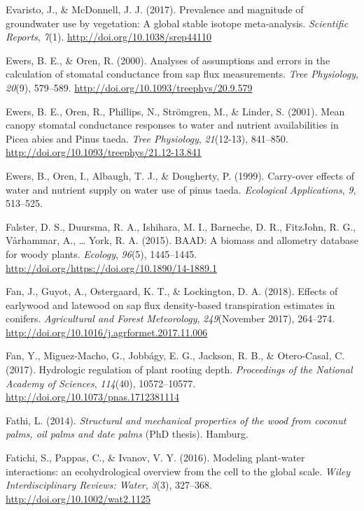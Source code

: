 \documentclass[11pt,twoside]{reedthesis}
\begin{document}
\hypertarget{ref-evaristo2017}{}
Evaristo, J., \& McDonnell, J. J. (2017). Prevalence and magnitude of
groundwater use by vegetation: A global stable isotope meta-analysis.
\emph{Scientific Reports}, \emph{7}(1).
\url{http://doi.org/10.1038/srep44110}

\hypertarget{ref-ewers_analyses_2000}{}
Ewers, B. E., \& Oren, R. (2000). Analyses of assumptions and errors in
the calculation of stomatal conductance from sap flux measurements.
\emph{Tree Physiology}, \emph{20}(9), 579--589.
\url{http://doi.org/10.1093/treephys/20.9.579}

\hypertarget{ref-Ewers2001}{}
Ewers, B. E., Oren, R., Phillips, N., Strömgren, M., \& Linder, S.
(2001). Mean canopy stomatal conductance responses to water and nutrient
availabilities in Picea abies and Pinus taeda. \emph{Tree Physiology},
\emph{21}(12-13), 841--850.
\url{http://doi.org/10.1093/treephys/21.12-13.841}

\hypertarget{ref-Ewers1999}{}
Ewers, B., Oren, I., Albaugh, T. J., \& Dougherty, P. (1999). Carry-over
effects of water and nutrient supply on water use of pinus taeda.
\emph{Ecological Applications}, \emph{9}, 513--525.

\hypertarget{ref-Falster2015}{}
Falster, D. S., Duursma, R. A., Ishihara, M. I., Barneche, D. R.,
FitzJohn, R. G., Vårhammar, A., \ldots{} York, R. A. (2015). BAAD: A
biomass and allometry database for woody plants. \emph{Ecology},
\emph{96}(5), 1445--1445.
\url{http://doi.org/https://doi.org/10.1890/14-1889.1}

\hypertarget{ref-Fan2018}{}
Fan, J., Guyot, A., Ostergaard, K. T., \& Lockington, D. A. (2018).
Effects of earlywood and latewood on sap flux density-based
transpiration estimates in conifers. \emph{Agricultural and Forest
Meteorology}, \emph{249}(November 2017), 264--274.
\url{http://doi.org/10.1016/j.agrformet.2017.11.006}

\hypertarget{ref-fan_hydrologic_2017}{}
Fan, Y., Miguez-Macho, G., Jobbágy, E. G., Jackson, R. B., \&
Otero-Casal, C. (2017). Hydrologic regulation of plant rooting depth.
\emph{Proceedings of the National Academy of Sciences}, \emph{114}(40),
10572--10577. \url{http://doi.org/10.1073/pnas.1712381114}

\hypertarget{ref-Fathi2014}{}
Fathi, L. (2014). \emph{Structural and mechanical properties of the wood
from coconut palms, oil palms and date palms} (PhD thesis). Hamburg.

\hypertarget{ref-Fatichi2016}{}
Fatichi, S., Pappas, C., \& Ivanov, V. Y. (2016). Modeling plant-water
interactions: an ecohydrological overview from the cell to the global
scale. \emph{Wiley Interdisciplinary Reviews: Water}, \emph{3}(3),
327--368. \url{http://doi.org/10.1002/wat2.1125}
\end{document}
